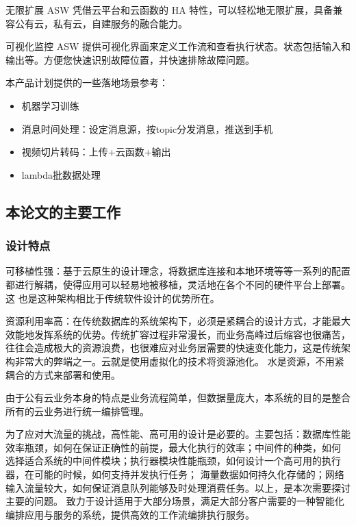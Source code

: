 无限扩展
ASW 凭借云平台和云函数的 HA 特性，可以轻松地无限扩展，具备兼容公有云，私有云，自建服务的融合能力。

可视化监控
ASW 提供可视化界面来定义工作流和查看执行状态。状态包括输入和输出等。方便您快速识别故障位置，并快速排除故障问题。


本产品计划提供的一些落地场景参考：

    \begin{itemize}
        \item 机器学习训练
        \item 消息时间处理：设定消息源，按topic分发消息，推送到手机
        \item 视频切片转码：上传+云函数+输出
        \item lambda批数据处理
    \end{itemize}



\subsection{本论文的主要工作}

\subsubsection{设计特点}
可移植性强：基于云原生的设计理念，将数据库连接和本地环境等等一系列的配置都进行解耦，使得应用可以轻易地被移植，灵活地在各个不同的硬件平台上部署。这
也是这种架构相比于传统软件设计的优势所在\cite{othe2}。

资源利用率高：在传统数据库的系统架构下，必须是紧耦合的设计方式，才能最大效能地发挥系统的优势。传统扩容过程非常漫长，而业务高峰过后缩容也很痛苦，
往往会造成极大的资源浪费，也很难应对业务层需要的快速变化能力，这是传统架构非常大的弊端之一\cite{kube2021near}。云就是使用虚拟化的技术将资源池化。
水是资源，不用紧耦合的方式来部署和使用\cite{roberson2021dbspdrp}。


由于公有云业务本身的特点是业务流程简单，但数据量庞大，本系统的目的是整合所有的云业务进行统一编排管理。

为了应对大流量的挑战，高性能、高可用的设计是必要的。主要包括：数据库性能效率瓶颈，如何在保证正确性的前提，最大化执行的效率；中间件的种类，如何
选择适合系统的中间件模块；执行器模块性能瓶颈，如何设计一个高可用的执行器，在可能的时候，如何支持并发执行任务；
海量数据如何持久化存储的；网络输入流量较大，如何保证消息队列能够及时处理消费任务。以上，是本次需要探讨主要的问题。
致力于设计适用于大部分场景，满足大部分客户需要的一种智能化编排应用与服务的系统，提供高效的工作流编排执行服务。

